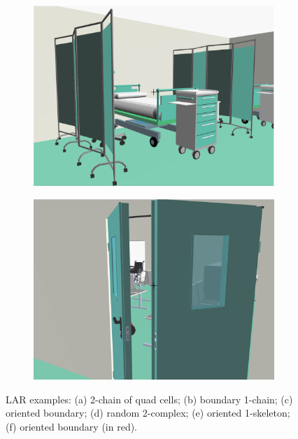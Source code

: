 \documentclass[]{egpubl}
\begin{document}
\begin{figure}[htbp]
\begin{subfigure}[b]{0.175\textwidth}
   \includegraphics[width=\textwidth]{images/emergency/6}
   \caption{}
   \end{subfigure}
\hspace{-3mm}   
   \begin{subfigure}[b]{0.175\textwidth}
   \includegraphics[width=\textwidth]{images/emergency/7}
   \caption{}
   \end{subfigure}
   
   \caption{LAR examples: (a) 2-chain of quad cells; (b) boundary 1-chain; (c) oriented boundary; (d) random 2-complex; (e) oriented 1-skeleton; (f) oriented boundary (in red).}
   \label{fig:meshes}
\end{figure}
\end{document}
